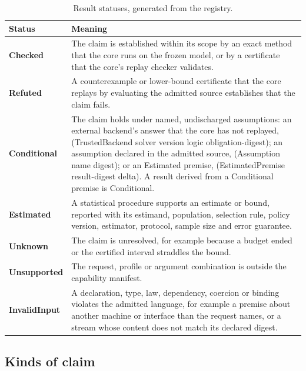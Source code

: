 \documentclass[11pt]{article}
\theoremstyle{definition}
\theoremstyle{plain}
\begin{document}
\begin{table}[ht]
\centering\small
\begin{tabularx}{\textwidth}{>{\bfseries}p{2.4cm}X}
\toprule
Status & Meaning\\
\midrule
Checked & The claim is established within its scope by an exact method that the core runs on the frozen model,\allowbreak{} or by a certificate that the core's replay checker validates.\\
Refuted & A counterexample or lower-bound certificate that the core replays by evaluating the admitted source establishes that the claim fails.\\
Conditional & The claim holds under named,\allowbreak{} undischarged assumptions: an external backend's answer that the core has not replayed,\allowbreak{} (TrustedBackend solver version logic obligation-digest); an assumption declared in the admitted source,\allowbreak{} (Assumption name digest); or an Estimated premise,\allowbreak{} (EstimatedPremise result-digest delta). A result derived from a Conditional premise is Conditional.\\
Estimated & A statistical procedure supports an estimate or bound,\allowbreak{} reported with its estimand,\allowbreak{} population,\allowbreak{} selection rule,\allowbreak{} policy version,\allowbreak{} estimator,\allowbreak{} protocol,\allowbreak{} sample size and error guarantee.\\
Unknown & The claim is unresolved,\allowbreak{} for example because a budget ended or the certified interval straddles the bound.\\
Unsupported & The request,\allowbreak{} profile or argument combination is outside the capability manifest.\\
InvalidInput & A declaration,\allowbreak{} type,\allowbreak{} law,\allowbreak{} dependency,\allowbreak{} coercion or binding violates the admitted language,\allowbreak{} for example a premise about another machine or interface than the request names,\allowbreak{} or a stream whose content does not match its declared digest.\\
\bottomrule
\end{tabularx}
\caption{Result statuses, generated from the registry.}\label{tab:status}
\end{table}

\subsection{Kinds of claim}\label{sec:claimkinds}
\end{document}
